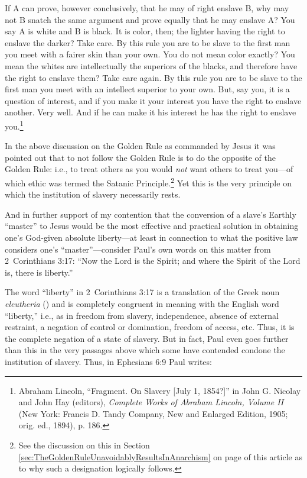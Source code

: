 \documentclass[letterpaper,12pt]{article}
\newenvironment{squote}
  {\small\quote}
  {\endquote\normalsize}
\begin{document}
\begin{squote}
If A can prove, however conclusively, that he may of right enslave B, why may not B snatch the same argument and prove equally that he may enslave A? You say A is white and B is black. It is color, then; the lighter having the right to enslave the darker? Take care. By this rule you are to be slave to the first man you meet with a fairer skin than your own. You do not mean color exactly? You mean the whites are intellectually the superiors of the blacks, and therefore have the right to enslave them? Take care again. By this rule you are to be slave to the first man you meet with an intellect superior to your own. But, say you, it is a question of interest, and if you make it your interest you have the right to enslave another. Very well. And if he can make it his interest he has the right to enslave you.\footnote{Abraham Lincoln, ``Fragment. On Slavery [July 1, 1854?]'' in John G. Nicolay and John Hay (editors), \emph{Complete Works of Abraham Lincoln, Volume II} (New York: Francis D. Tandy Company, New and Enlarged Edition, 1905; orig. ed., 1894), p. 186.}
\end{squote}

In the above discussion on the Golden Rule as commanded by Jesus it was pointed out that to not follow the Golden Rule is to do the opposite of the Golden Rule: i.e., to treat others as you would \emph{not} want others to treat you---of which ethic was termed the Satanic Principle.\footnote{See the discussion on this in Section \ref{sec:TheGoldenRuleUnavoidablyResultsInAnarchism} on page \pageref{SatanicPrinciple} of this article as to why such a designation logically follows.} Yet this is the very principle on which the institution of slavery necessarily rests.

And in further support of my contention that the conversion of a slave's Earthly ``master'' to Jesus would be the most effective and practical solution in obtaining one's God-given absolute liberty---at least in connection to what the positive law considers one's ``master''---consider Paul's own words on this matter from 2~Corinthians 3:17: ``Now the Lord is the Spirit; and where the Spirit of the Lord is, there is liberty.''

The word ``liberty'' in 2~Corinthians 3:17 is a translation of the Greek noun \emph{eleutheria} () and is completely congruent in meaning with the English word ``liberty,'' i.e., \label{EleutheriaDefinition}as in freedom from slavery, independence, absence of external restraint, a negation of control or domination, freedom of access, etc. Thus, it is the complete negation of a state of slavery. But in fact, Paul even goes further than this in the very passages above which some have contended condone the institution of slavery. Thus, in Ephesians 6:9 Paul writes:
\end{document}
